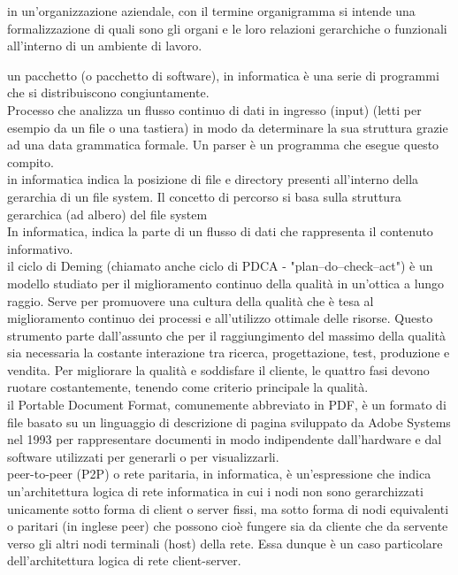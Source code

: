 \documentclass{scalatekids-article}
\begin{document}
   in un'organizzazione aziendale, con il termine organigramma si intende una formalizzazione di quali sono gli organi e le loro relazioni gerarchiche o funzionali all'interno di un ambiente di lavoro.
  \\


   un pacchetto (o pacchetto di software), in informatica è una serie di programmi che si distribuiscono congiuntamente.
  \\

   Processo che analizza un flusso continuo di dati in ingresso (input) (letti per esempio da un file o una tastiera) in modo da determinare la sua struttura grazie ad una data grammatica formale. Un parser è un programma che esegue questo compito.
  \\
  
   in informatica indica la posizione di file e directory presenti all'interno della gerarchia di un file system. Il concetto di percorso si basa sulla struttura gerarchica (ad albero) del file system
  \\

   In informatica, indica la parte di un flusso di dati che rappresenta il contenuto informativo.
  \\
  
   il ciclo di Deming (chiamato anche ciclo di PDCA - "plan–do–check–act") è un modello studiato per il miglioramento continuo della qualità in un'ottica a lungo raggio. Serve per promuovere una cultura della qualità che è tesa al miglioramento continuo dei processi e all'utilizzo ottimale delle risorse. Questo strumento parte dall'assunto che per il raggiungimento del massimo della qualità sia necessaria la costante interazione tra ricerca, progettazione, test, produzione e vendita. Per migliorare la qualità e soddisfare il cliente, le quattro fasi devono ruotare costantemente, tenendo come criterio principale la qualità.
  \\

   il Portable Document Format, comunemente abbreviato in PDF, è un formato di file basato su un linguaggio di descrizione di pagina sviluppato da Adobe Systems nel 1993 per rappresentare documenti in modo indipendente dall'hardware e dal software utilizzati per generarli o per visualizzarli.
  \\

   peer-to-peer (P2P) o rete paritaria, in informatica, è un'espressione che indica un'architettura logica di rete informatica in cui i nodi non sono gerarchizzati unicamente sotto forma di client o server fissi, ma sotto forma di nodi equivalenti o paritari (in inglese peer) che possono cioè fungere sia da cliente che da servente verso gli altri nodi terminali (host) della rete. Essa dunque è un caso particolare dell'architettura logica di rete client-server.
  \\
\end{document}
